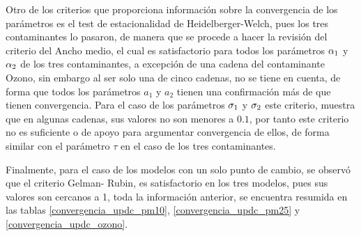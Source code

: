 Otro de los criterios que proporciona información sobre la convergencia de los parámetros es el test de estacionalidad de Heidelberger-Welch, pues los tres contaminantes lo pasaron, de manera que se procede a hacer la revisión del criterio del Ancho medio, el cual es satisfactorio para todos los parámetros $\alpha_1$ y $\alpha_2$ de los tres contaminantes, a excepción de una cadena del contaminante Ozono, sin embargo al ser solo una de cinco cadenas, no se tiene en cuenta, de forma que todos los parámetros $a_1$ y $a_2$ tienen una confirmación más de que tienen convergencia. Para el caso de los parámetros $\sigma_1$ y $\sigma_2$ este criterio, muestra que en algunas cadenas, sus valores no son menores a $0.1$, por tanto este criterio no es suficiente o de apoyo para argumentar convergencia de ellos, de forma similar con el parámetro $\tau$ en el caso de los tres contaminantes. 


Finalmente, para el caso de los modelos con un solo punto de cambio, se observó que el criterio Gelman- Rubin, es satisfactorio en los tres modelos, pues sus valores son cercanos a 1, toda la información anterior, se encuentra resumida en las tablas \ref{convergencia_updc_pm10}, \ref{convergencia_updc_pm25} y \ref{convergencia_updc_ozono}.





